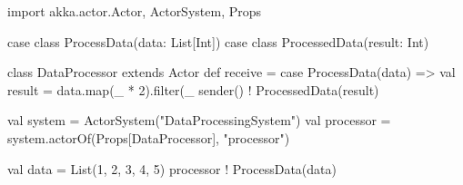 import akka.actor.{Actor, ActorSystem, Props}

case class ProcessData(data: List[Int])
case class ProcessedData(result: Int)

class DataProcessor extends Actor {
  def receive = {
    case ProcessData(data) =>
      val result = data.map(_ * 2).filter(_ %
      sender() ! ProcessedData(result)
  }
}

val system = ActorSystem("DataProcessingSystem")
val processor = system.actorOf(Props[DataProcessor], "processor")

val data = List(1, 2, 3, 4, 5)
processor ! ProcessData(data)